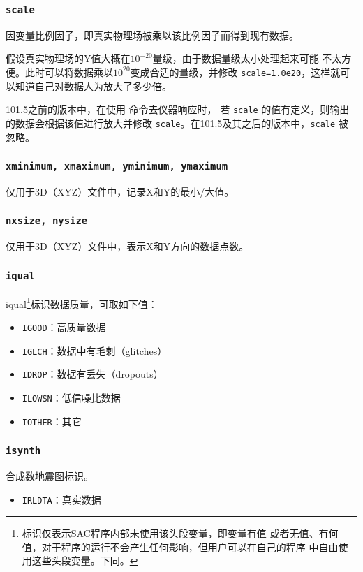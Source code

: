 \subsubsection{\texttt{scale}}
因变量比例因子，即真实物理场被乘以该比例因子而得到现有数据。

假设真实物理场的Y值大概在$10^{-20}$量级，由于数据量级太小处理起来可能
不太方便。此时可以将数据乘以$10^{20}$变成合适的量级，并修改
\texttt{scale=1.0e20}，这样就可以知道自己对数据人为放大了多少倍。

101.5之前的版本中，在使用  命令去仪器响应时，
若 \texttt{scale} 的值有定义，则输出的数据会根据该值进行放大并修改
\texttt{scale}。在101.5及其之后的版本中，\texttt{scale} 被忽略。

\subsubsection{\texttt{xminimum, xmaximum, yminimum, ymaximum}}
仅用于3D（XYZ）文件中，记录X和Y的最小/大值。

\subsubsection{\texttt{nxsize, nysize}}
仅用于3D（XYZ）文件中，表示X和Y方向的数据点数。

\subsubsection{\texttt{iqual}\dag}
iqual\footnote{\dag 标识仅表示SAC程序内部未使用该头段变量，即变量有值
或者无值、有何值，对于程序的运行不会产生任何影响，但用户可以在自己的程序
中自由使用这些头段变量。下同。}标识数据质量，可取如下值：
\begin{itemize}
\item \texttt{IGOOD}：高质量数据
\item \texttt{IGLCH}：数据中有毛刺（glitches）
\item \texttt{IDROP}：数据有丢失（dropouts）
\item \texttt{ILOWSN}：低信噪比数据
\item \texttt{IOTHER}：其它
\end{itemize}

\subsubsection{\texttt{isynth}\dag}
合成数地震图标识。
\begin{itemize}
\item \texttt{IRLDTA}：真实数据
\end{itemize}

